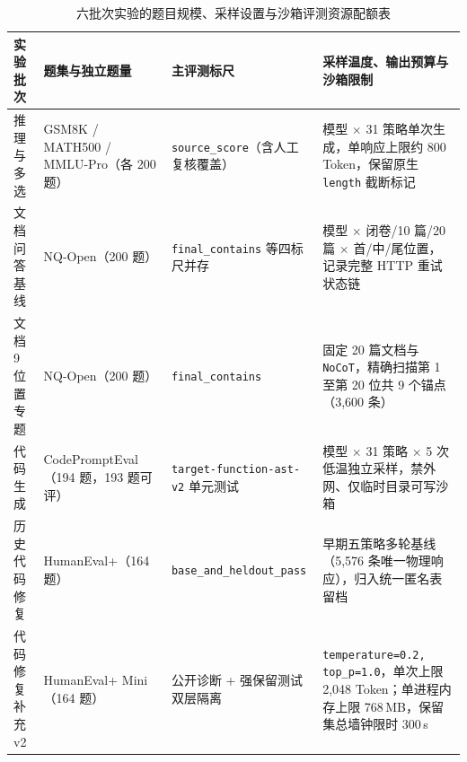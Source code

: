 {\begin{table}[!htbp]
\centering
\caption{六批次实验的题目规模、采样设置与沙箱评测资源配额表}\label{tab:app-b-batches}
\ReportTableStyle
\begin{tabularx}{\linewidth}{@{}>{\raggedright\arraybackslash}p{2.5cm} >{\raggedright\arraybackslash}p{3.05cm} >{\raggedright\arraybackslash}p{2.8cm} >{\raggedright\arraybackslash}X@{}}
\toprule
\textbf{实验批次} & \textbf{题集与独立题量} & \textbf{主评测标尺} & \textbf{采样温度、输出预算与沙箱限制} \\
\midrule
推理与多选 & GSM8K / MATH500 / MMLU-Pro（各 200 题） & \texttt{source\_score}（含人工复核覆盖） & 4 模型 $\times$ 31 策略单次生成，单响应上限约 800 Token，保留原生 \texttt{length} 截断标记 \\
文档问答基线 & NQ-Open（200 题） & \texttt{final\_contains} 等四标尺并存 & 2 模型 $\times$ 闭卷/10 篇/20 篇 $\times$ 首/中/尾位置，记录完整 HTTP 重试状态链 \\
文档 9 位置专题 & NQ-Open（200 题） & \texttt{final\_contains} & 固定 20 篇文档与 \texttt{NoCoT}，精确扫描第 1 至第 20 位共 9 个锚点（3,600 条） \\
代码生成 & CodePromptEval（194 题，193 题可评） & \texttt{target-function-ast-v2} 单元测试 & 3 模型 $\times$ 31 策略 $\times$ 5 次低温独立采样，禁外网、仅临时目录可写沙箱 \\
历史代码修复 & HumanEval+（164 题） & \texttt{base\_and\_heldout\_pass} & 早期五策略多轮基线（5,576 条唯一物理响应），归入统一匿名表留档 \\
代码修复补充 v2 & HumanEval+ Mini（164 题） & 公开诊断 + 强保留测试双层隔离 & \texttt{temperature=0.2, top\_p=1.0}，单次上限 2,048 Token；单进程内存上限 768\,MB，保留集总墙钟限时 300\,s \\
\bottomrule
\end{tabularx}
\end{table}}
